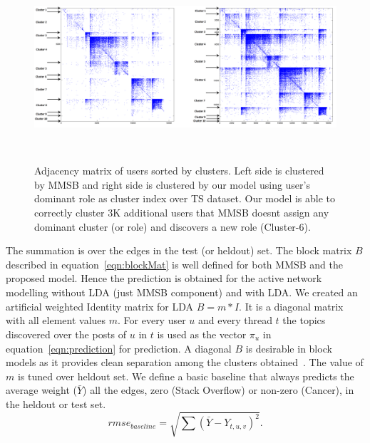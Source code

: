 \documentclass{sig-alternate}
\begin{document}
\begin{center}
\begin{figure}
\includegraphics[height=7cm,width=18cm]{SimilarityMatTSAnnotated.png}
\caption{Adjacency matrix of users sorted by clusters. Left side is 
clustered by MMSB and right side is clustered by our model using user's dominant
role as cluster index over TS dataset. Our model is able to correctly cluster 3K
additional users that MMSB doesnt assign any dominant cluster (or role) and
discovers a new role (Cluster-6).}
\label{fig:similarityMatTS}
\end{figure}
\end{center}
The summation is over the edges in the test (or heldout) set. The block matrix
$B$ described in equation~\ref{eqn:blockMat} is well defined for both MMSB and
the proposed model. Hence the prediction is obtained for the active network modelling without
LDA (just MMSB component) and with LDA. We created an artificial
weighted Identity matrix for LDA $\hat{B}=m*I$. It is a diagonal matrix with
all element values $m$. For every user $u$ and every thread $t$ the topics discovered over the
posts of $u$ in $t$ is used as the vector $\pi_u$ in
equation~\ref{eqn:prediction} for prediction. A diagonal $B$ is desirable in
block models as it provides clean separation among the clusters
obtained~\cite{Airoldi:2008:MMS:1390681.1442798}.
The value of $m$ is tuned over heldout set. We define a basic baseline that
always predicts the average weight ($\bar{Y}$) all the edges, zero (Stack
Overflow) or non-zero (Cancer), in the heldout or test set.
\begin{equation}
rmse_{baseline} = \sqrt{\sum(\bar{Y}-Y_{t,u,v})^2}.
\end{equation}
\end{document}
